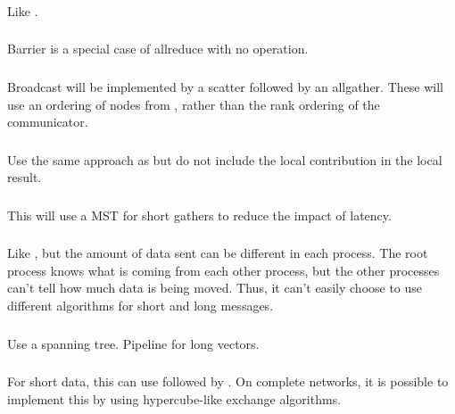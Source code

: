 \documentclass{article}
\begin{document}
\subsubsection{}
Like .

\subsubsection{}
Barrier is a special case of allreduce with no operation.

\subsubsection{}
Broadcast will be implemented by a scatter followed by an allgather.  These
will use an ordering of nodes from , rather than
the rank ordering of the communicator.

\subsubsection{}
Use the same approach as  but do not include the local
contribution in the local result.

\subsubsection{}
This will use a MST for short gathers to reduce the impact of latency.  

\subsubsection{}
Like , but the amount of data sent can be different in
each process.  The root process knows what is coming from each other process,
but the other processes can't tell how much data is being moved.  Thus, it
can't easily choose to use different algorithms for short and long messages.  

\subsubsection{}
Use a spanning tree.  Pipeline for long vectors.

\subsubsection{}
For short data, this can use  followed by
.  On 
complete networks, it is possible to implement this by using hypercube-like
exchange algorithms.
\end{document}
